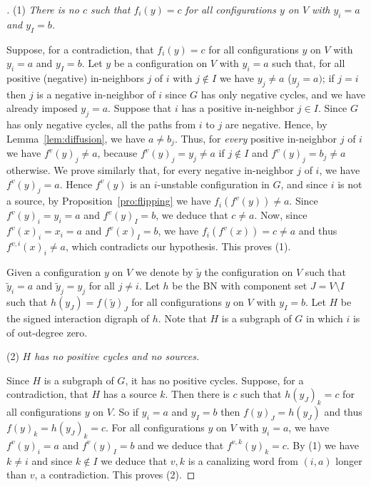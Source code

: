 \documentclass[11pt,letter]{article}
\newcommand{\BF}[1]{{{\boldmath{\bf #1}\unboldmath}}}
\begin{document}
\begin{proof}[\BF{Proof of Lemmas~\ref{lem:no_fixed_vertex} and \ref{lem:no_fixed_vertex_2}}]
\bigskip
\noindent
(1) {\em There is no $c$ such that $f_i(y)=c$ for all configurations $y$ on $V$ with $y_i=a$ and $y_I=b$.}

\medskip
\noindent
Suppose, for a contradiction, that $f_i(y)=c$ for all configurations $y$ on $V$ with $y_i=a$ and $y_I=b$. Let $y$ be a configuration on $V$ with $y_i=a$  such that, for all positive (negative) in-neighbors $j$ of $i$ with $j\not\in I$ we have $y_j\neq a$ ($y_j=a)$; if $j=i$ then $j$ is a negative in-neighbor of $i$ since $G$ has only negative cycles, and we have already imposed $y_j=a$. Suppose that $i$ has a positive in-neighbor $j\in I$. Since $G$ has only negative cycles, all the paths from $i$ to $j$ are negative. Hence, by Lemma~\ref{lem:diffusion}, we have $a\neq b_j$. Thus, for {\em every} positive in-neighbor $j$ of $i$ we have $f^v(y)_j\neq a$, because $f^v(y)_j=y_j\neq a$ if $j\not\in I$ and $f^v(y)_j=b_j\neq a$ otherwise. We prove similarly that, for every negative in-neighbor $j$ of $i$, we have $f^v(y)_j=a$. Hence $f^v(y)$ is an $i$-unstable configuration in $G$, and since $i$ is not a source, by Proposition~\ref{pro:flipping} we have $f_i(f^v(y))\neq a$. Since $f^v(y)_i=y_i=a$ and $f^v(y)_I=b$, we deduce that $c\neq a$. Now, since $f^v(x)_i=x_i=a$ and $f^v(x)_I=b$, we have $f_i(f^v(x))=c\neq a$ and thus $f^{v,i}(x)_i\neq a$, which contradicts our hypothesis. This proves (1). 

\bigskip
Given a configuration $y$ on $V$ we denote by $\tilde y$ the configuration on $V$ such that $\tilde y_i=a$ and $\tilde y_j=y_j$ for all $j\neq i$. Let $h$ be the BN with component set $J=V\setminus I$ such that $h(y_J)=f(\tilde y)_J$ for all configurations $y$ on $V$ with $y_I=b$. Let $H$ be the signed interaction digraph of $h$. Note that $H$ is a subgraph of $G$ in which $i$ is of out-degree zero.

\bigskip
\noindent
(2) {\em $H$ has no positive cycles and no sources.}

\medskip
\noindent
Since $H$ is a subgraph of $G$, it has no positive cycles. Suppose, for a contradiction, that $H$ has a source $k$. Then there is $c$ such that $h(y_J)_k=c$ for all configurations $y$ on $V$. So if $y_i=a$ and $y_I=b$ then $f(y)_J=h(y_J)$ and thus $f(y)_k=h(y_J)_k=c$. For all configurations $y$ on $V$ with $y_i=a$, we have $f^{v}(y)_i=a$ and $f^v(y)_I=b$ and we deduce that $f^{v,k}(y)_k=c$. By (1) we have $k\neq i$ and since $k\not\in I$ we deduce that $v,k$ is a canalizing word from $(i,a)$ longer than $v$, a contradiction. This proves (2). 


\end{proof}
\end{document}
